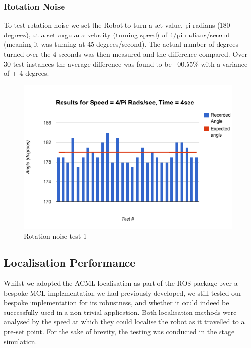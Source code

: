 \documentclass{article}
\begin{document}
\begin{multicols}{2}
	\subsubsection{Rotation Noise}
	To test rotation noise we set the Robot to turn a set value, pi radians (180 degrees), at a set angular.z velocity (turning speed) of 4/pi radians/second (meaning it was turning at 45 degrees/second). The actual number of degrees turned over the 4 seconds was then measured and the difference compared. Over 30 test instances the average difference was found to be ~00.55\% with a variance of +-4 degrees.
	\begin{figure}[H]
	\begin{center}
	\includegraphics[width=0.9\linewidth]{ExperimentalResults7}
	\caption{Rotation noise test 1}
	\end{center}
	\end{figure}
	
	\subsection{Localisation Performance}
	Whilst we adopted the ACML localisation as part of the ROS package over a bespoke MCL implementation we had previously developed, we still tested our bespoke implementation for its robustness, and whether it could indeed be successfully used in a non-trivial application. Both localisation methods were analysed by the speed at which they could localise the robot as it travelled to a pre-set point. For the sake of brevity, the testing was conducted in the stage simulation.


\end{multicols}
\end{document}
